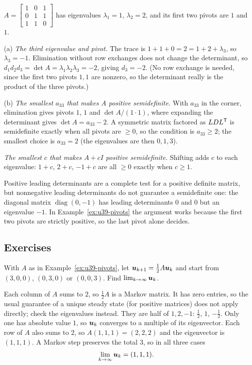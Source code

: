 \begin{example}\label{ex:u39-pivots}
$A=\begin{bmatrix}1&0&1\\0&1&1\\1&1&0\end{bmatrix}$ has eigenvalues $\lambda_1=1$, $\lambda_2=2$, and its first two pivots are $1$ and $1$.

(a) \emph{The third eigenvalue and pivot.} The trace is $1+1+0=2=1+2+\lambda_3$, so $\lambda_3=-1$. Elimination without row exchanges does not change the determinant, so $d_1d_2d_3=\det A=\lambda_1\lambda_2\lambda_3=-2$, giving $d_3=-2$. (No row exchange is needed, since the first two pivots $1,1$ are nonzero, so the determinant really is the product of the three pivots.)

(b) \emph{The smallest $a_{33}$ that makes $A$ positive semidefinite.} With $a_{33}$ in the corner, elimination gives pivots $1$, $1$ and $\det A/(1\cdot1)$, where expanding the determinant gives $\det A=a_{33}-2$. A symmetric matrix factored as $LDL^{\mathsf{T}}$ is semidefinite exactly when all pivots are $\ge0$, so the condition is $a_{33}\ge2$; the smallest choice is $a_{33}=2$ (the eigenvalues are then $0,1,3$).

\emph{The smallest $c$ that makes $A+cI$ positive semidefinite.} Shifting adds $c$ to each eigenvalue: $1+c$, $2+c$, $-1+c$ are all $\ge0$ exactly when $c\ge1$.
\end{example}

\begin{trap}
Positive leading determinants are a complete test for a positive definite matrix, but nonnegative leading determinants do not guarantee a semidefinite one: the diagonal matrix $\operatorname{diag}(0,-1)$ has leading determinants $0$ and $0$ but an eigenvalue $-1$. In Example~\ref{ex:u39-pivots} the argument works because the first two pivots are strictly positive, so the last pivot alone decides.
\end{trap}

\subsection{Exercises}

\begin{exercise}\label{exr:u39-halfA}
With $A$ as in Example~\ref{ex:u39-pivots}, let $\boldsymbol{u}_{k+1}=\tfrac12A\boldsymbol{u}_k$ and start from $(3,0,0)$, $(0,3,0)$ or $(0,0,3)$. Find $\lim_{k\to\infty}\boldsymbol{u}_k$.
\end{exercise}
\begin{solution}
Each column of $A$ sums to $2$, so $\tfrac12A$ is a Markov matrix. It has zero entries, so the usual guarantee of a unique steady state (for positive matrices) does not apply directly; check the eigenvalues instead. They are half of $1,2,-1$: $\tfrac12$, $1$, $-\tfrac12$. Only one has absolute value $1$, so $\boldsymbol{u}_k$ converges to a multiple of its eigenvector. Each row of $A$ also sums to $2$, so $A(1,1,1)=(2,2,2)$ and the eigenvector is $(1,1,1)$. A Markov step preserves the total $3$, so in all three cases
\[
\lim_{k\to\infty}\boldsymbol{u}_k=(1,1,1).
\]
\end{solution}

